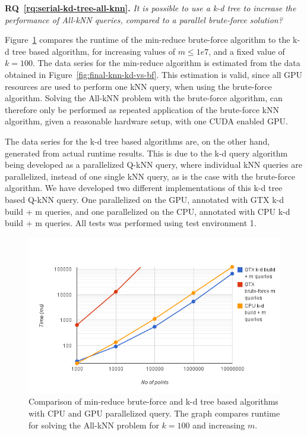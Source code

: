 \textbf{RQ~\ref{rq:serial-kd-tree-all-knn}.} \emph{It is possible to use a k-d tree to increase the performance of All-kNN queries, compared to a parallel brute-force solution?}

Figure~\ref{fig:final-all-knn-gpu-vs-cpu-vs-bf} compares the runtime of the min-reduce brute-force algorithm to the k-d tree based algorithm, for increasing values of $m\le1e7$, and a fixed value of $k=100$. The data series for the min-reduce algorithm is estimated from the data obtained in Figure~\ref{fig:final-knn-kd-vs-bf}. This estimation is valid, since all GPU resources are used to perform one kNN query, when using the brute-force algorithm. Solving the All-kNN problem with the brute-force algorithm, can therefore only be performed as repeated application of the brute-force kNN algorithm, given a reasonable hardware setup, with one CUDA enabled GPU\@.

The data series for the k-d tree based algorithms are, on the other hand, generated from actual runtime results. This is due to the k-d query algorithm being developed as a parallelized Q-kNN query, where individual kNN queries are parallelized, instead of one single kNN query, as is the case with the brute-force algorithm. We have developed two different implementations of this k-d tree based Q-kNN query. One parallelized on the GPU, annotated with GTX k-d build + m queries, and one parallelized on the CPU, annotated with CPU k-d build + m queries. All tests was performed using test environment 1.

\begin{figure}[ht!]
    \centering
    \includegraphics[width=120mm]{../gfx/final-all-knn-gpu-vs-cpu-vs-bf.png}
    \caption{Comparison of min-reduce brute-force and k-d tree based algorithms with CPU and GPU parallelized query. The graph compares runtime for solving the All-kNN problem for $k=100$ and increasing $m$.}
    \label{fig:final-all-knn-gpu-vs-cpu-vs-bf}
\end{figure}

